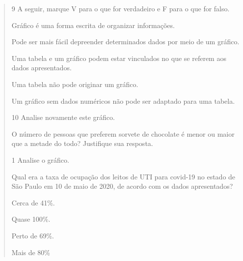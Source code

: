 \begin{quote}
\num{9} A seguir, marque V para o que for verdadeiro e F para o que for falso.

\begin{boxlist}
\item Gráfico é uma forma escrita de organizar informações. 

\item Pode ser mais fácil depreender determinados dados por meio de um gráfico. 

\item Uma tabela e um gráfico podem estar vinculados no que se referem aos dados apresentados. 

\item Uma tabela não pode originar um gráfico. 

\item Um gráfico sem dados numéricos não pode ser adaptado para uma tabela. 
\end{boxlist}

\num{10} Analise novamente este gráfico.


O número de pessoas que preferem sorvete de chocolate é menor ou maior que a metade do todo? Justifique sua resposta.



\num{1} Analise o gráfico.


Qual era a taxa de ocupação dos leitos de UTI para covid-19 no estado de São
Paulo em 10 de maio de 2020, de acordo com os dados apresentados?

\begin{escolha}
\item Cerca de 41\%.

\item Quase 100\%.

\item Perto de 69\%.

\item Mais de 80\%
\end{escolha}


\end{quote}
